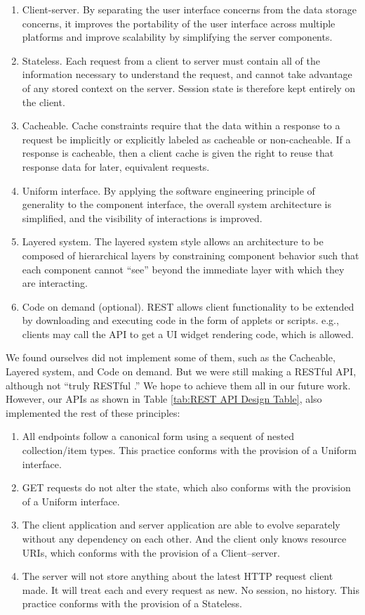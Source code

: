 \begin{enumerate}
  \item Client-server. By separating the user interface concerns from the data storage concerns, it improves the portability of the user interface across multiple platforms and improve scalability by simplifying the server components.
  \item Stateless. Each request from a client to server must contain all of the information necessary to understand the request, and cannot take advantage of any stored context on the server. Session state is therefore kept entirely on the client.
  \item Cacheable. Cache constraints require that the data within a response to a request be implicitly or explicitly labeled as cacheable or non-cacheable. If a response is cacheable, then a client cache is given the right to reuse that response data for later, equivalent requests.
  \item Uniform interface. By applying the software engineering principle of generality to the component interface, the overall system architecture is simplified, and the visibility of interactions is improved.
  \item Layered system. The layered system style allows an architecture to be composed of hierarchical layers by constraining component behavior such that each component cannot ``see'' beyond the immediate layer with which they are interacting.
  \item Code on demand (optional). REST allows client functionality to be extended by downloading and executing code in the form of applets or scripts. e.g., clients may call the API to get a UI widget rendering code, which is allowed.
\end{enumerate}

We found ourselves did not implement some of them, such as the Cacheable, Layered system, and Code on demand. But we were still making a RESTful API, although not “truly RESTful \cite{web:RESTArchitecturalConstraints}.” We hope to achieve them all in our future work. However, our APIs as shown in Table \ref{tab:REST API Design Table}, also implemented the rest of these principles:

\begin{enumerate}
  \item All endpoints follow a canonical form using a sequent of nested collection/item types. This practice conforms with the provision of a Uniform interface.
  \item GET requests do not alter the state, which also conforms with the provision of a Uniform interface.
  \item The client application and server application are able to evolve separately without any dependency on each other. And the client only knows resource URIs, which conforms with the provision of a Client–server.
  \item The server will not store anything about the latest HTTP request client made. It will treat each and every request as new. No session, no history. This practice conforms with the provision of a Stateless.
\end{enumerate}

